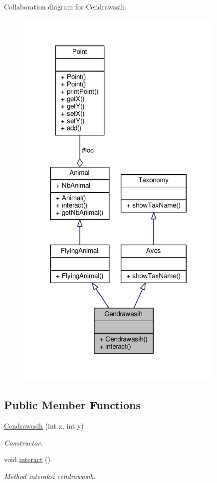 Collaboration diagram for Cendrawasih\+:
\nopagebreak
\begin{figure}[H]
\begin{center}
\leavevmode
\includegraphics[width=284pt]{classCendrawasih__coll__graph}
\end{center}
\end{figure}
\subsection*{Public Member Functions}
\begin{DoxyCompactItemize}
\item 
\hyperlink{classCendrawasih_a4ccdd43fd72f96b5f7ef32a8dfc7f299}{Cendrawasih} (int x, int y)
\begin{DoxyCompactList}\small\item\em Constructor. \end{DoxyCompactList}\item 
void \hyperlink{classCendrawasih_ab24c4c34838000da51a810dec7d29669}{interact} ()\hypertarget{classCendrawasih_ab24c4c34838000da51a810dec7d29669}{}\label{classCendrawasih_ab24c4c34838000da51a810dec7d29669}

\begin{DoxyCompactList}\small\item\em Method interaksi cendrawasih. \end{DoxyCompactList}\end{DoxyCompactItemize}
